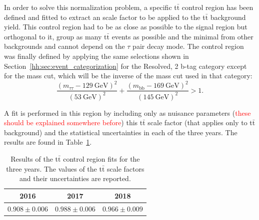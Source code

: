 \documentclass[../main.tex]{subfiles}
\begin{document}
In order to solve this normalization problem, a specific t$\bar{\text{t}}$ control region has been defined and fitted to extract an scale factor to be applied to the t$\bar{\text{t}}$ background yield. This control region had to be as close as possible to the signal region but orthogonal to it, group as many t$\bar{\text{t}}$ events as possible and the minimal from other backgrounds and cannot depend on the $\tau$ pair decay mode. The control region was finally defined by applying the same selections shown in Section~\ref{hh:sec:event_categorization} for the Resolved, 2 b-tag category except for the mass cut, which will be the inverse of the mass cut used in that category:
\begin{equation}
\frac{(m_{\tau\tau} - 129~\text{GeV})^2}{(53~\text{GeV})^2} + \frac{(m_\text{bb} - 169~\text{GeV})^2}{(145~\text{GeV})^2} > 1.
\end{equation}

A fit is performed in this region by including only as nuisance parameters (\textcolor{red}{these should be explained somewhere before}) this t$\bar{\text{t}}$ scale factor (that applies only to t$\bar{\text{t}}$ background) and the statistical uncertainties in each of the three years. The results are found in Table~\ref{hh:tab:ttsf}.

\begin{table}[h!]
\begin{center}
\begin{tabular}{c | c | c}
2016 & 2017 & 2018 \\
\hline
$0.908 \pm 0.006$ &  $0.988 \pm 0.006$ & $0.966 \pm 0.009$
\end{tabular}
\end{center}
\caption{Results of the t$\bar{\text{t}}$ control region fits for the three years. The values of the t$\bar{\text{t}}$ scale factors and their uncertainties are reported.}
\label{hh:tab:ttsf}
\end{table}




%
%
\end{document}
